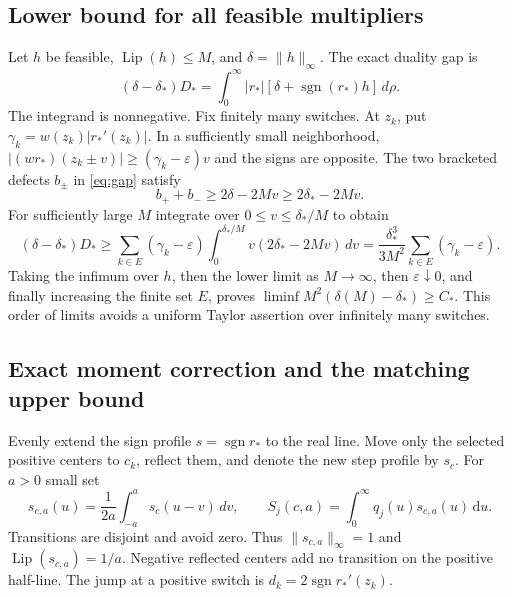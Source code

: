 \documentclass[11pt,a4paper]{article}
\numberwithin{equation}{section}
\theoremstyle{remark}\newtheorem{remark}[theorem]{Remark}
\DeclareMathOperator{\Lip}{Lip}
\DeclareMathOperator{\sgn}{sgn}
\newcommand{\dd}{\,\mathrm du}
\newcommand{\ds}{\delta_*}
\newcommand{\Ds}{D_*}
\newcommand{\Cs}{C_*}
\newcommand{\rs}{r_*}
\newcommand{\norm}[1]{\lVert#1\rVert}
\begin{document}
\subsection{Lower bound for all feasible multipliers}
Let $h$ be feasible, $\Lip(h)\le M$, and $\delta=\norm h_\infty$. The exact
duality gap is
\begin{equation}
 (\delta-\ds)\Ds=
 \int_0^\infty |\rs|[\delta+\sgn(\rs)h]\,d\rho.\label{eq:gap}
\end{equation}
The integrand is nonnegative. Fix finitely many switches. At $z_k$, put
$\gamma_k=w(z_k)|\rs'(z_k)|$. In a sufficiently small neighborhood,
$|(w\rs)(z_k\pm v)|\ge(\gamma_k-\varepsilon)v$ and the signs are opposite.
The two bracketed defects $b_\pm$ in \eqref{eq:gap} satisfy
\begin{equation}
 b_++b_-\ge2\delta-2Mv\ge2\ds-2Mv.
\end{equation}
For sufficiently large $M$ integrate over $0\le v\le\ds/M$ to obtain
\begin{equation}
 (\delta-\ds)\Ds\ge
 \sum_{k\in E}(\gamma_k-\varepsilon)
 \int_0^{\ds/M}v(2\ds-2Mv)\,dv
 =\frac{\ds^3}{3M^2}\sum_{k\in E}(\gamma_k-\varepsilon).
\end{equation}
Taking the infimum over $h$, then the lower limit as $M\to\infty$, then
$\varepsilon\downarrow0$, and finally increasing the finite set $E$, proves
$\liminf M^2(\delta(M)-\ds)\ge\Cs$. This order of limits avoids a uniform
Taylor assertion over infinitely many switches.

\subsection{Exact moment correction and the matching upper bound}
Evenly extend the sign profile $s=\sgn\rs$ to the real line. Move only the
selected positive centers to $c_k$, reflect them, and denote the new step
profile by $s_c$. For $a>0$ small set
\begin{equation}
 s_{c,a}(u)=\frac1{2a}\int_{-a}^a s_c(u-v)\,dv,
 \qquad S_j(c,a)=\int_0^\infty q_j(u)s_{c,a}(u)\dd.\label{eq:ramps}
\end{equation}
Transitions are disjoint and avoid zero. Thus $\norm{s_{c,a}}_\infty=1$
and $\Lip(s_{c,a})=1/a$. Negative reflected centers add no transition on
the positive half-line. The jump at a positive switch is
$d_k=2\sgn\rs'(z_k)$.
\end{document}
